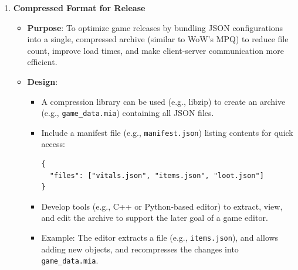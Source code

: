 \begin{enumerate}
    \item \textbf{Compressed Format for Release}
        \begin{itemize}
            \item \textbf{Purpose}: To optimize game releases by bundling JSON configurations into a single, compressed archive (similar to WoW’s MPQ) to reduce file count, improve load times, and make client-server communication more efficient.
            \item \textbf{Design}:
                \begin{itemize}
                    \item A compression library can be used (e.g., libzip) to create an archive (e.g., \texttt{game\_data.mia}) containing all JSON files.
                    \item Include a manifest file (e.g., \texttt{manifest.json}) listing contents for quick access:
                    \begin{lstlisting}[style=htmlstyle]
{
  "files": ["vitals.json", "items.json", "loot.json"]
}
                    \end{lstlisting}
                    \item Develop tools (e.g., C++ or Python-based editor) to extract, view, and edit the archive to support the later goal of a game editor.
                    \item Example: The editor extracts a file (e.g., \texttt{items.json}), and allows adding new objects, and recompresses the changes into \texttt{game\_data.mia}.
                \end{itemize}
        \end{itemize}


\end{enumerate}
